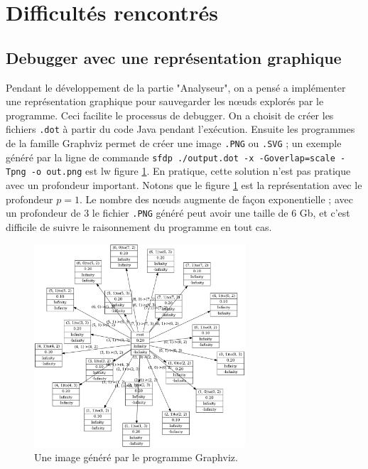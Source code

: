 \documentclass{article}
\begin{document}
\section{Difficultés rencontrés}

\subsection{Debugger avec une représentation graphique}
\par Pendant le développement de la partie "Analyseur", on a pensé a implémenter une représentation graphique pour sauvegarder les nœuds explorés par le programme. Ceci facilite le processus de debugger. On a choisit de créer les fichiers \texttt{.dot} à partir du code Java pendant l'exécution. Ensuite les programmes de la famille Graphviz permet de créer une image \texttt{.PNG} ou \texttt{.SVG} ; un exemple généré par la ligne de commande \texttt{sfdp ./output.dot -x -Goverlap=scale -Tpng -o out.png} est lw figure \ref{fig:graph-graphviz}. En pratique, cette solution n'est pas pratique avec un profondeur important. Notons que le figure \ref{fig:graph-graphviz} est la représentation avec le profondeur $ p = 1$. Le nombre des nœuds augmente de façon exponentielle ; avec un profondeur de 3 le fichier \texttt{.PNG} généré peut avoir une taille de 6 Gb, et c'est difficile de suivre le raisonnement du programme en tout cas.

\begin{figure}[htb]
    \centering
    \includegraphics[width=0.7\textwidth]{out.png}
    \caption{Une image généré par le programme Graphviz.}
    \label{fig:graph-graphviz}
\end{figure}
\end{document}
